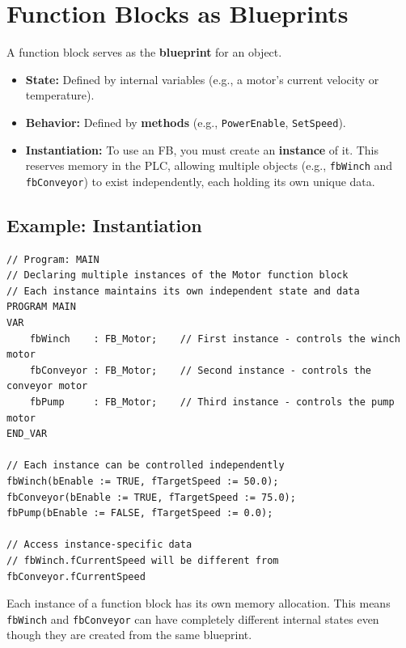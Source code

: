 \documentclass[11pt,a4paper]{article}
\begin{document}
\section{Function Blocks as Blueprints}

A function block serves as the \textbf{blueprint} for an object.

\begin{itemize}[leftmargin=*]
    \item \textbf{State:} Defined by internal variables (e.g., a motor's current velocity or temperature).
    
    \item \textbf{Behavior:} Defined by \textbf{methods} (e.g., \texttt{PowerEnable}, \texttt{SetSpeed}).
    
    \item \textbf{Instantiation:} To use an FB, you must create an \textbf{instance} of it. This reserves memory in the PLC, allowing multiple objects (e.g., \texttt{fbWinch} and \texttt{fbConveyor}) to exist independently, each holding its own unique data.
\end{itemize}

\subsection*{Example: Instantiation}

\begin{lstlisting}
// Program: MAIN
// Declaring multiple instances of the Motor function block
// Each instance maintains its own independent state and data
PROGRAM MAIN
VAR
    fbWinch    : FB_Motor;    // First instance - controls the winch motor
    fbConveyor : FB_Motor;    // Second instance - controls the conveyor motor
    fbPump     : FB_Motor;    // Third instance - controls the pump motor
END_VAR

// Each instance can be controlled independently
fbWinch(bEnable := TRUE, fTargetSpeed := 50.0);
fbConveyor(bEnable := TRUE, fTargetSpeed := 75.0);
fbPump(bEnable := FALSE, fTargetSpeed := 0.0);

// Access instance-specific data
// fbWinch.fCurrentSpeed will be different from fbConveyor.fCurrentSpeed
\end{lstlisting}

\begin{notebox}
Each instance of a function block has its own memory allocation. This means \texttt{fbWinch} and \texttt{fbConveyor} can have completely different internal states even though they are created from the same blueprint.
\end{notebox}
\end{document}
